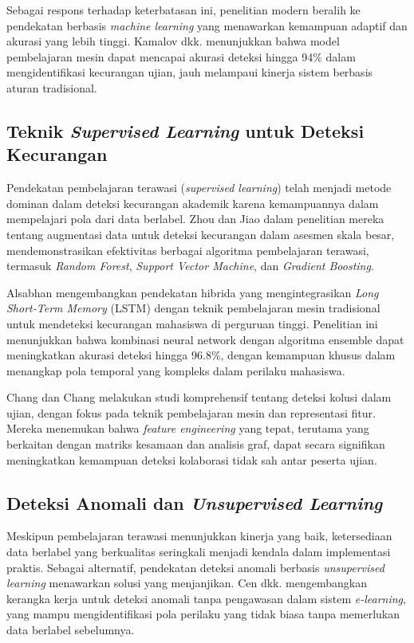 Sebagai respons terhadap keterbatasan ini, penelitian modern beralih ke pendekatan berbasis \textit{machine learning} yang menawarkan kemampuan adaptif dan akurasi yang lebih tinggi. Kamalov dkk. \cite{Kamalov2021} menunjukkan bahwa model pembelajaran mesin dapat mencapai akurasi deteksi hingga 94\% dalam mengidentifikasi kecurangan ujian, jauh melampaui kinerja sistem berbasis aturan tradisional.

\subsection{Teknik \textit{Supervised Learning} untuk Deteksi Kecurangan}

Pendekatan pembelajaran terawasi (\textit{supervised learning}) telah menjadi metode dominan dalam deteksi kecurangan akademik karena kemampuannya dalam mempelajari pola dari data berlabel. Zhou dan Jiao \cite{Zhou2022} dalam penelitian mereka tentang augmentasi data untuk deteksi kecurangan dalam asesmen skala besar, mendemonstrasikan efektivitas berbagai algoritma pembelajaran terawasi, termasuk \textit{Random Forest}, \textit{Support Vector Machine}, dan \textit{Gradient Boosting}.

Alsabhan \cite{Alsabhan2023} mengembangkan pendekatan hibrida yang mengintegrasikan \textit{Long Short-Term Memory} (LSTM) dengan teknik pembelajaran mesin tradisional untuk mendeteksi kecurangan mahasiswa di perguruan tinggi. Penelitian ini menunjukkan bahwa kombinasi neural network dengan algoritma ensemble dapat meningkatkan akurasi deteksi hingga 96.8\%, dengan kemampuan khusus dalam menangkap pola temporal yang kompleks dalam perilaku mahasiswa.

Chang dan Chang \cite{Chang2023} melakukan studi komprehensif tentang deteksi kolusi dalam ujian, dengan fokus pada teknik pembelajaran mesin dan representasi fitur. Mereka menemukan bahwa \textit{feature engineering} yang tepat, terutama yang berkaitan dengan matriks kesamaan dan analisis graf, dapat secara signifikan meningkatkan kemampuan deteksi kolaborasi tidak sah antar peserta ujian.

\subsection{Deteksi Anomali dan \textit{Unsupervised Learning}}

Meskipun pembelajaran terawasi menunjukkan kinerja yang baik, ketersediaan data berlabel yang berkualitas seringkali menjadi kendala dalam implementasi praktis. Sebagai alternatif, pendekatan deteksi anomali berbasis \textit{unsupervised learning} menawarkan solusi yang menjanjikan. Cen dkk. \cite{survey:anomaly_detection_edu} mengembangkan kerangka kerja untuk deteksi anomali tanpa pengawasan dalam sistem \textit{e-learning}, yang mampu mengidentifikasi pola perilaku yang tidak biasa tanpa memerlukan data berlabel sebelumnya.

